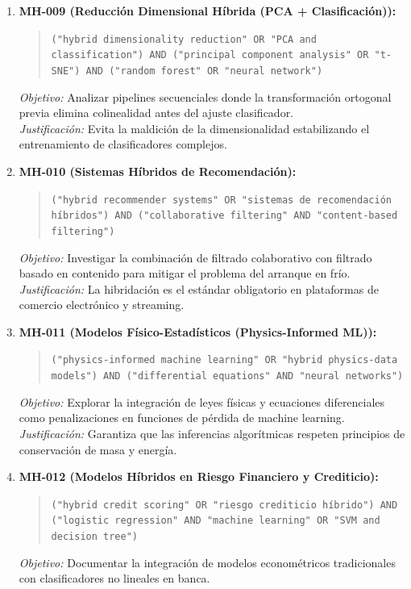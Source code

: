 \begin{enumerate}
  \textit{Justificación:} Resuelve problemas de búsqueda en espacios multimodales donde el gradiente no existe o es ruidoso.
  \item \textbf{MH-009 (Reducción Dimensional Híbrida (PCA + Clasificación)):}
  \begin{quote}
  \texttt{("hybrid dimensionality reduction" OR "PCA and classification") AND ("principal component analysis" OR "t-SNE") AND ("random forest" OR "neural network")}
  \end{quote}
  \textit{Objetivo:} Analizar pipelines secuenciales donde la transformación ortogonal previa elimina colinealidad antes del ajuste clasificador.\\
  \textit{Justificación:} Evita la maldición de la dimensionalidad estabilizando el entrenamiento de clasificadores complejos.
  \item \textbf{MH-010 (Sistemas Híbridos de Recomendación):}
  \begin{quote}
  \texttt{("hybrid recommender systems" OR "sistemas de recomendación híbridos") AND ("collaborative filtering" AND "content-based filtering")}
  \end{quote}
  \textit{Objetivo:} Investigar la combinación de filtrado colaborativo con filtrado basado en contenido para mitigar el problema del arranque en frío.\\
  \textit{Justificación:} La hibridación es el estándar obligatorio en plataformas de comercio electrónico y streaming.
  \item \textbf{MH-011 (Modelos Físico-Estadísticos (Physics-Informed ML)):}
  \begin{quote}
  \texttt{("physics-informed machine learning" OR "hybrid physics-data models") AND ("differential equations" AND "neural networks")}
  \end{quote}
  \textit{Objetivo:} Explorar la integración de leyes físicas y ecuaciones diferenciales como penalizaciones en funciones de pérdida de machine learning.\\
  \textit{Justificación:} Garantiza que las inferencias algorítmicas respeten principios de conservación de masa y energía.
  \item \textbf{MH-012 (Modelos Híbridos en Riesgo Financiero y Crediticio):}
  \begin{quote}
  \texttt{("hybrid credit scoring" OR "riesgo crediticio híbrido") AND ("logistic regression" AND "machine learning" OR "SVM and decision tree")}
  \end{quote}
  \textit{Objetivo:} Documentar la integración de modelos econométricos tradicionales con clasificadores no lineales en banca.\\

\end{enumerate}

